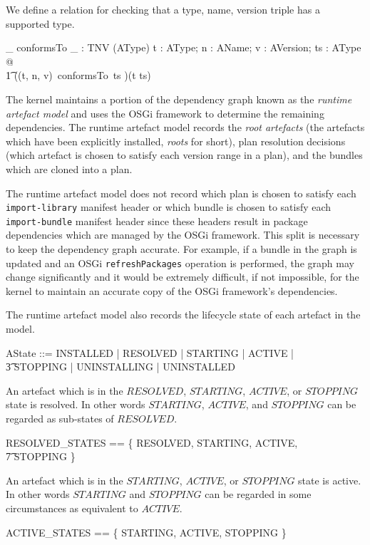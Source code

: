 \documentclass[a4paper,12pt]{article}
\begin{document}
We define a relation for checking that a type, name, version triple has a supported type.
\begin{axdef}
\_ conformsTo \_ : TNV \rel (\power AType)
\where
\forall t : AType; n : AName; v : AVersion; ts : \power AType @ \\
\t1  ((t, n, v)~conformsTo~ts )\iff (t \in ts) \\
\end{axdef}

The kernel maintains a portion of the dependency graph known as the \textit{runtime artefact model}
and uses the OSGi framework to determine the remaining dependencies.
The runtime artefact model records the \textit{root artefacts} (the artefacts which have been explicitly installed, \textit{roots} for short), plan resolution decisions (which
artefact is chosen to satisfy each version range in a plan), and the bundles which are cloned
into a plan.

The runtime artefact model does not record which plan is chosen to satisfy each
\texttt{import-library} manifest header or which bundle is chosen to satisfy
each \texttt{import-bundle} manifest header since these headers result in package
dependencies which are managed by the OSGi framework.
This split is necessary to keep the dependency graph accurate.
For example, if a bundle in the
graph is updated and an OSGi \texttt{refreshPackages} operation is performed, the graph may change
significantly and it would be extremely difficult, if not impossible, for the kernel to maintain an accurate copy of the OSGi framework's dependencies.

The runtime artefact model also records the lifecycle state of each artefact in the model.
\begin{zed}
AState ::= INSTALLED | RESOLVED | STARTING | ACTIVE | \\
\t3 STOPPING | UNINSTALLING | UNINSTALLED \\
\end{zed}

An artefact which is in the $RESOLVED$, $STARTING$, $ACTIVE$, or $STOPPING$ state is
resolved.
In other words $STARTING$, $ACTIVE$, and $STOPPING$ can be regarded as sub-states of
$RESOLVED$.
\begin{zed}
RESOLVED\_STATES == \{ RESOLVED, STARTING, ACTIVE, \\
\t7 STOPPING \}
\end{zed}

An artefact which is in the $STARTING$, $ACTIVE$, or $STOPPING$ state is
active.
In other words $STARTING$ and $STOPPING$ can be regarded in some circumstances as
equivalent to $ACTIVE$.
\begin{zed}
ACTIVE\_STATES == \{ STARTING, ACTIVE, STOPPING \}
\end{zed}
\end{document}
